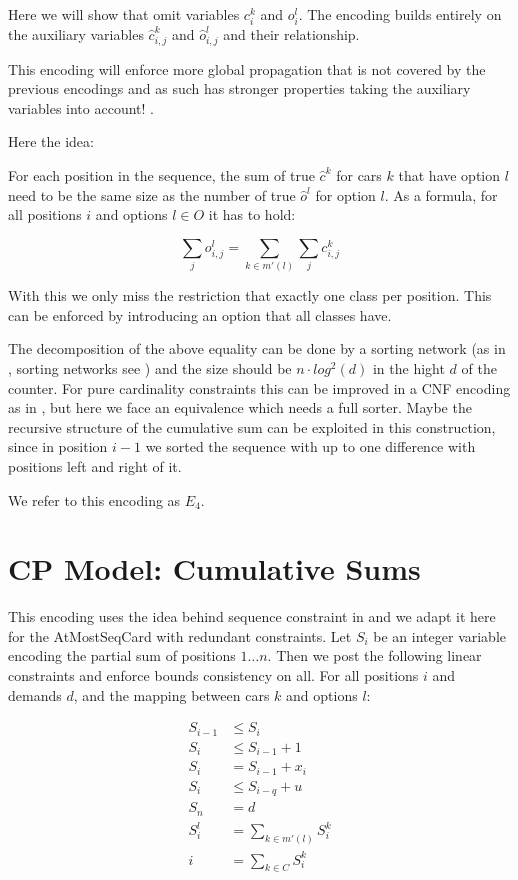\documentclass[]{llncs}
\newcommand{\TODO}[1]{ {\color{red}{#1} }}
\newcommand{\AtMostSeqCard}{AtMostSeqCard }
\begin{document}
Here we will show that omit variables $c^k_{i}$ and $o^l_{i}$. The
encoding builds entirely on the auxiliary variables $\hat{c}^k_{i,j}$
and $\hat{o}^l_{i,j}$ and their relationship.

This encoding will enforce more global propagation that is not covered
by the previous encodings and as such has stronger properties taking the
auxiliary variables into account! \TODO{give example which propagation
is missing}.

Here the idea: 

For each position in the sequence, the sum of true $\hat{c}^k$ for cars
$k$ that have option $l$ need to be the same size as the number of true
$\hat{o}^l$ for option $l$. As a formula, for all positions $i$ and
options $ l \in O$ it has to hold: 

$$ \sum_{j} o^l_{i,j} = \sum_{k \in m'(l)} \sum_j c^k_{i,j} $$

With this we only miss the restriction that exactly one class per
position. This can be enforced by introducing an option that all classes
have. 

The decomposition of the above equality  can be done by a sorting
network (as in \cite{Een06}, sorting networks see \cite{Batcher68}) and
the size should be $n\cdot log^2 (d) $ in the hight $d$ of the counter.
For pure cardinality constraints this can be improved in a CNF encoding
as in \cite{Asin11,Codish10}, but here we face an equivalence which
needs a full sorter. Maybe the recursive structure of the cumulative sum
can be exploited in this construction, since in position $i-1$ we sorted
the sequence with up to one difference with positions left and right of
it. 

We refer to this encoding as $E_4$.

\section{CP Model: Cumulative Sums}

This encoding uses the idea behind sequence constraint in \cite{Brand07}
and we adapt it here for the \AtMostSeqCard with redundant constraints.
Let $S_i$ be an integer variable encoding the partial sum of positions
$1\ldots n$. Then we post the following linear constraints and enforce
bounds consistency on all. For all positions $i$ and demands $d$, and
the mapping between cars $k$ and options $l$: 

\begin{align}
    S_{i-1} & \leq S_i \\
    S_i & \leq S_{i-1} + 1 \\
    S_i & = S_{i-1} + x_i \\
    S_i & \leq S_{i-q} + u  \\
    S_n & = d \\
    S^l_i & = \sum_{k \in m'(l)} S^k_i \\
    i & = \sum_{k \in C} S^k_i
\end{align}
\end{document}
